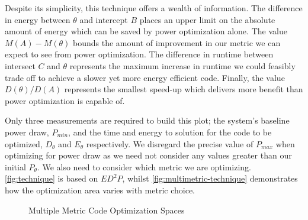 Despite its simplicity, this technique offers a wealth of information. The difference in energy between $\theta$ and intercept $B$ places an upper limit on the absolute amount of energy which can be saved by power optimization alone. The value $M(A) - M(\theta)$ bounds the amount of improvement in our metric we can expect to see from power optimization. The difference in runtime between intersect $C$ and $\theta$ represents the maximum increase in runtime we could feasibly trade off to achieve a slower yet more energy efficient code. Finally, the value $D(\theta) / D(A)$ represents the smallest speed-up which delivers more benefit than power optimization is capable of.

Only three measurements are required to build this plot; the system's baseline power draw, $P_{min}$, and the time and energy to solution for the code to be optimized, $D_\theta$ and $E_\theta$ respectively. We disregard the precise value of $P_{max}$ when optimizing for power draw as we need not consider any values greater than our initial $P_\theta$. We also need to consider which metric we are optimizing. \autoref{fig:technique} is based on $ED^2P$, whilst \autoref{fig:multimetric-technique} demonstrates how the optimization area varies with metric choice.


\begin{figure}
\centering

\caption{Multiple Metric Code Optimization Spaces}
\label{fig:multimetric-technique}
\end{figure}
